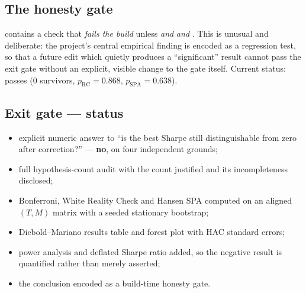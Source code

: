 \subsection{The honesty gate}

 contains a check that \emph{fails the build} unless
 \emph{and}  \emph{and}
. This is unusual and deliberate: the project's central
empirical finding is encoded as a regression test, so that a future edit which quietly
produces a ``significant'' result cannot pass the exit gate without an explicit, visible
change to the gate itself. Current status: passes (0 survivors, $p_{\text{RC}}=0.868$,
$p_{\text{SPA}}=0.638$).

\subsection{Exit gate --- status}

\begin{itemize}
  \item[\checkmark] explicit numeric answer to ``is the best Sharpe still distinguishable
    from zero after correction?'' --- \textbf{no}, on four independent grounds;
  \item[\checkmark] full hypothesis-count audit with the count justified and its
    incompleteness disclosed;
  \item[\checkmark] Bonferroni, White Reality Check and Hansen SPA computed on an aligned
    $(T,M)$ matrix with a seeded stationary bootstrap;
  \item[\checkmark] Diebold--Mariano results table and forest plot with HAC standard
    errors;
  \item[\checkmark] power analysis and deflated Sharpe ratio added, so the negative result
    is quantified rather than merely asserted;
  \item[\checkmark] the conclusion encoded as a build-time honesty gate.
\end{itemize}
